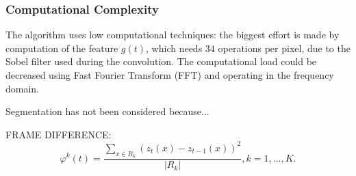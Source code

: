 \documentclass{llncs}
\begin{document}
\subsubsection{Computational Complexity}

The algorithm uses low computational techniques: the biggest effort is made by computation of the feature $g(t)$, which needs $34$ operations per pixel, due to the Sobel filter used during the convolution.
The computational load could be decreased using Fast Fourier Transform (FFT) \cite{brigham1988fast} and operating in the frequency domain.

Segmentation has not been considered because...

FRAME DIFFERENCE:
\begin{equation}
	\label{eq:frameDiffReg}
	\varphi^k(t) = \frac{\sum_{x \in R_k}(z_t(x) - z_{t-1}(x))^2}{|R_k|}, k=1,\dots,K.
\end{equation}
	

\end{document}
